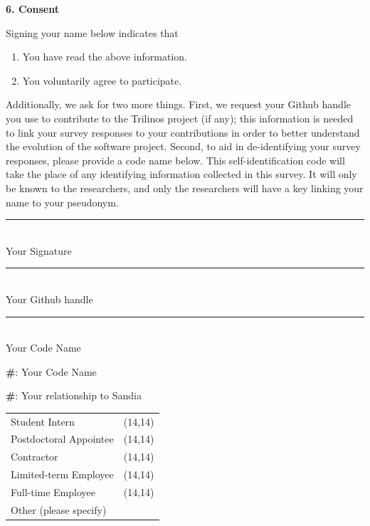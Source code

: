 \documentclass[12pt, letterpaper]{article}
\newcommand{\incrcounter}[1]{\addtocounter{#1}{1}}
\newcounter{questionnum}
\newcounter{subquestionnum}
\newcommand{\question}[2]{\setcounter{subquestionnum}{0} \textbf{\#\thequestionnum}: #1 #2}
\newcommand{\triplesignature}[3]{%
  \parbox{\textwidth}{
    \vspace{1cm}

    \parbox{4cm}{
      \centering
      \fbox{\TextField[name=first,width=4cm,charsize=12pt]{}}
      \rule{4cm}{1pt}\\
       #1 
    }
    \hfill
    \parbox{4cm}{
      \centering
      \fbox{\TextField[name=second,width=4cm,charsize=12pt]{}}
      \rule{4cm}{1pt}\\
      #2
    }
    \hfill
    \parbox{4cm}{
      \centering
      \fbox{\TextField[name=third,width=4cm,charsize=12pt]{}}
      \rule{3.9cm}{1pt}\\
      #3
    }
  }
}
\begin{document}
\begin{center}
{\begin{minipage}{1\linewidth}
		\textbf{6. Consent} %
		
		Signing your name below indicates that

		\begin{enumerate} 
			\item You have read the above information.
			\item You voluntarily agree to participate.
		\end{enumerate}
		
		Additionally, we ask for two more things. First, we request your Github handle you use to contribute to the Trilinos project (if any); this information is needed to link 		your survey responses to your contributions in order to better understand the evolution of the software project. Second, to aid in de-identifying your survey responses, 		please provide a code name below. This self-identification code will take the place of any identifying information collected in this survey. It will only be known to the 		researchers, and only the researchers will have a key linking your name to your pseudonym.
		
		\triplesignature{Your Signature}{Your Github handle}{Your Code Name}

	\end{minipage}
	}
	\end{center}
	
	
	
	
	
	\pagebreak
	
	\question{Your Code Name}{ \fbox{\TextField[name=name,width=5cm,charsize=12pt]{}}   } \incrcounter{questionnum}
	
	\question{Your relationship to Sandia}{
		\begin{longtable}{l l}
		 	Student Intern & \framebox(14,14){} \\
		 	Postdoctoral Appointee & \framebox(14,14){} \\
			Contractor & \framebox(14,14){} \\
		 	Limited-term Employee & \framebox(14,14){} \\
		 	Full-time Employee & \framebox(14,14){} \\
		 	Other (please specify) & \fbox{\TextField[name=jobother,height=0.5cm,width=5cm,charsize=12pt]{}} \\
		\end{longtable}
	} \incrcounter{questionnum}
	
\end{document}
